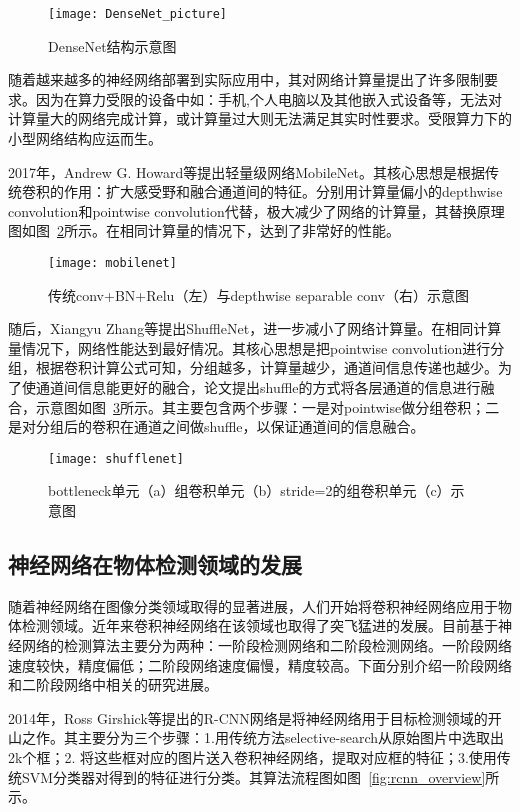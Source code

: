 \begin{figure}[htp]
\centering
\texttt{[image: DenseNet\_picture]}
\caption{DenseNet结构示意图}
\label{fig:DenseNet_picture}
\end{figure}
随着越来越多的神经网络部署到实际应用中，其对网络计算量提出了许多限制要求。因为在算力受限的设备中如：手机,个人电脑以及其他嵌入式设备等，无法对计算量大的网络完成计算，或计算量过大则无法满足其实时性要求。受限算力下的小型网络结构应运而生。

2017年，Andrew G. Howard等提出轻量级网络MobileNet。其核心思想是根据传统卷积的作用：扩大感受野和融合通道间的特征。分别用计算量偏小的depthwise convolution和pointwise convolution代替，极大减少了网络的计算量，其替换原理图如图~\ref{fig:mobilenet}所示。在相同计算量的情况下，达到了非常好的性能。

\begin{figure}[htp]
\centering
\texttt{[image: mobilenet]}
\caption{传统conv+BN+Relu（左）与depthwise separable conv（右）示意图}
\label{fig:mobilenet}
\end{figure}
随后，Xiangyu Zhang等提出ShuffleNet，进一步减小了网络计算量。在相同计算量情况下，网络性能达到最好情况。其核心思想是把pointwise convolution进行分组，根据卷积计算公式可知，分组越多，计算量越少，通道间信息传递也越少。为了使通道间信息能更好的融合，论文提出shuffle的方式将各层通道的信息进行融合，示意图如图~\ref{fig:shufflenet}所示。其主要包含两个步骤：一是对pointwise做分组卷积；二是对分组后的卷积在通道之间做shuffle，以保证通道间的信息融合。

\begin{figure}[htp]
\centering
\texttt{[image: shufflenet]}
\caption{bottleneck单元（a）组卷积单元（b）stride=2的组卷积单元（c）示意图}
\label{fig:shufflenet}
\end{figure}
\subsection{神经网络在物体检测领域的发展}
随着神经网络在图像分类领域取得的显著进展，人们开始将卷积神经网络应用于物体检测领域。近年来卷积神经网络在该领域也取得了突飞猛进的发展。目前基于神经网络的检测算法主要分为两种：一阶段检测网络和二阶段检测网络。一阶段网络速度较快，精度偏低；二阶段网络速度偏慢，精度较高。下面分别介绍一阶段网络和二阶段网络中相关的研究进展。

2014年，Ross Girshick等提出的R-CNN网络是将神经网络用于目标检测领域的开山之作。其主要分为三个步骤：1.用传统方法selective-search从原始图片中选取出2k个框；2. 将这些框对应的图片送入卷积神经网络，提取对应框的特征；3.使用传统SVM分类器对得到的特征进行分类。其算法流程图如图~\ref{fig:rcnn_overview}所示。

